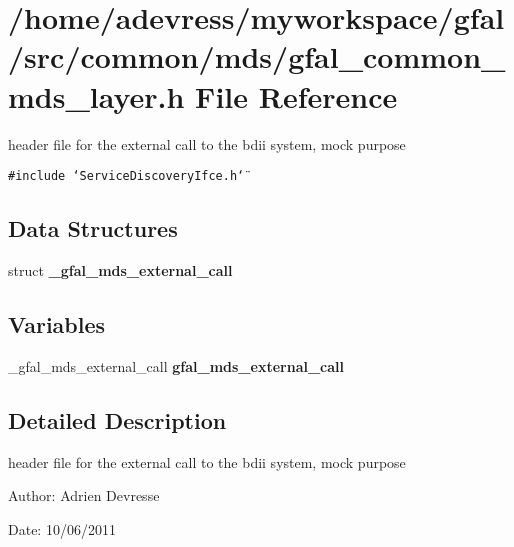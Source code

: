 \section{/home/adevress/myworkspace/gfal/src/common/mds/gfal\_\-common\_\-mds\_\-layer.h File Reference}
\label{gfal__common__mds__layer_8h}
header file for the external call to the bdii system, mock purpose 

{\tt \#include \char`\"{}Service\-Discovery\-Ifce.h\char`\"{}}\par
\subsection*{Data Structures}
\begin{CompactItemize}
\item 
struct \textbf{\_\-gfal\_\-mds\_\-external\_\-call}
\end{CompactItemize}
\subsection*{Variables}
\begin{CompactItemize}
\item 
\_\-gfal\_\-mds\_\-external\_\-call \textbf{gfal\_\-mds\_\-external\_\-call}\label{gfal__common__mds__layer_8h_75521e039a2ade0b9db637dd099def98}

\end{CompactItemize}


\subsection{Detailed Description}
header file for the external call to the bdii system, mock purpose 

\begin{Desc}
\item[Author:]Adrien Devresse \end{Desc}
\begin{Desc}
\item[Date:]10/06/2011 \end{Desc}
